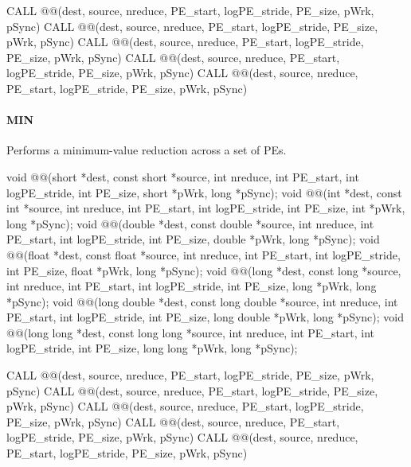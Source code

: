 \begin{apidefinition}
\begin{Fsynopsis}
CALL @@(dest, source, nreduce, PE_start, logPE_stride, PE_size, pWrk, pSync)
CALL @@(dest, source, nreduce, PE_start, logPE_stride, PE_size, pWrk, pSync)
CALL @@(dest, source, nreduce, PE_start, logPE_stride, PE_size, pWrk, pSync)
CALL @@(dest, source, nreduce, PE_start, logPE_stride, PE_size, pWrk, pSync)
CALL @@(dest, source, nreduce, PE_start, logPE_stride, PE_size, pWrk, pSync)
\end{Fsynopsis}

\paragraph{MIN}
Performs a minimum-value reduction across a set of \acp{PE}.\newline
\begin{Csynopsis}
void @@(short *dest, const short *source, int nreduce, int PE_start, int logPE_stride, int PE_size, short *pWrk, long *pSync);
void @@(int *dest, const int *source, int nreduce, int PE_start, int logPE_stride, int PE_size, int *pWrk, long *pSync);
void @@(double *dest, const double *source, int nreduce, int PE_start, int logPE_stride, int PE_size, double *pWrk, long *pSync);
void @@(float *dest, const float *source, int nreduce, int PE_start, int logPE_stride, int PE_size, float *pWrk, long *pSync);
void @@(long *dest, const long *source, int nreduce, int PE_start, int logPE_stride, int PE_size, long *pWrk, long *pSync);
void @@(long double *dest, const long double *source, int nreduce, int PE_start, int logPE_stride, int PE_size, long double *pWrk, long *pSync);
void @@(long long *dest, const long long *source, int nreduce, int PE_start, int logPE_stride, int PE_size, long long *pWrk, long *pSync);
\end{Csynopsis}

\begin{Fsynopsis}
CALL @@(dest, source, nreduce, PE_start, logPE_stride, PE_size, pWrk, pSync)
CALL @@(dest, source, nreduce, PE_start, logPE_stride, PE_size, pWrk, pSync)
CALL @@(dest, source, nreduce, PE_start, logPE_stride, PE_size, pWrk, pSync)
CALL @@(dest, source, nreduce, PE_start, logPE_stride, PE_size, pWrk, pSync)
CALL @@(dest, source, nreduce, PE_start, logPE_stride, PE_size, pWrk, pSync)
\end{Fsynopsis}


\end{apidefinition}
